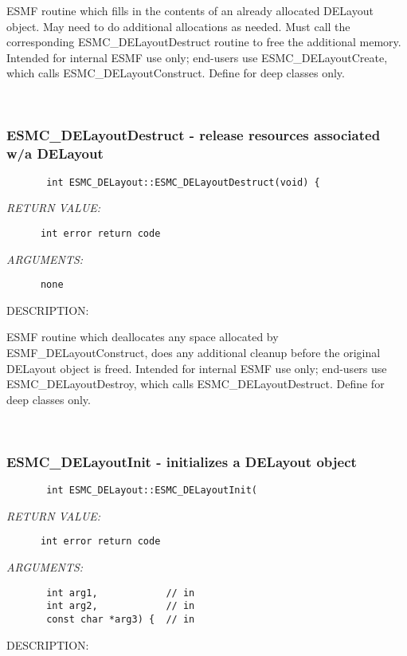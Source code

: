         ESMF routine which fills in the contents of an already
        allocated DELayout object.  May need to do additional allocations
        as needed.  Must call the corresponding ESMC\_DELayoutDestruct
        routine to free the additional memory.  Intended for internal
        ESMF use only; end-users use ESMC\_DELayoutCreate, which calls
        ESMC\_DELayoutConstruct.  Define for deep classes only.
   
 
\mbox{}\hrulefill\ 
 
\subsubsection{ESMC\_DELayoutDestruct - release resources associated w/a DELayout}


  
\begin{verbatim}       int ESMC_DELayout::ESMC_DELayoutDestruct(void) {\end{verbatim}{\em RETURN VALUE:}
\begin{verbatim}      int error return code\end{verbatim}{\em ARGUMENTS:}
\begin{verbatim}      none\end{verbatim}
{\sf DESCRIPTION:\\ }


        ESMF routine which deallocates any space allocated by
        ESMF\_DELayoutConstruct, does any additional cleanup before the
        original DELayout object is freed.  Intended for internal ESMF
        use only; end-users use ESMC\_DELayoutDestroy, which calls
        ESMC\_DELayoutDestruct.  Define for deep classes only.
   
 
\mbox{}\hrulefill\ 
 
\subsubsection{ESMC\_DELayoutInit - initializes a DELayout object}


  
\begin{verbatim}       int ESMC_DELayout::ESMC_DELayoutInit(\end{verbatim}{\em RETURN VALUE:}
\begin{verbatim}      int error return code\end{verbatim}{\em ARGUMENTS:}
\begin{verbatim}       int arg1,            // in
       int arg2,            // in
       const char *arg3) {  // in\end{verbatim}
{\sf DESCRIPTION:\\ }


